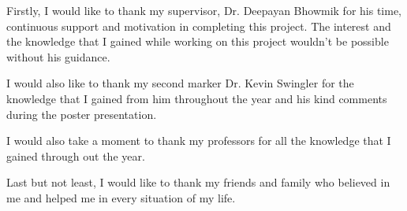 
Firstly, I would like to thank my supervisor, Dr. Deepayan Bhowmik for his time, continuous support and motivation in completing this project. The interest and the knowledge that I gained while working on this project wouldn't be possible without his guidance.

I would also like to thank my second marker Dr. Kevin Swingler for the knowledge that I gained from him throughout the year and his kind comments during the poster presentation. 

I would also take a moment to thank my professors for all the knowledge that I gained through out the year.

Last but not least, I would like to thank my friends and family who believed in me and helped me in every situation of my life.